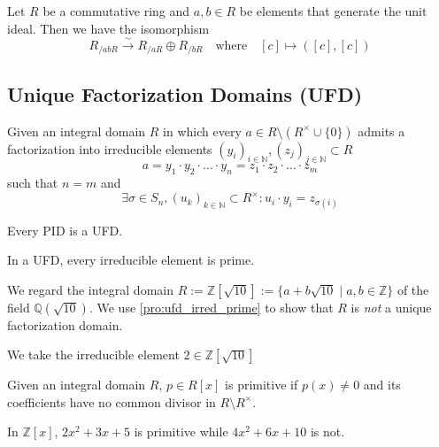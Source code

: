 \begin{lemma}
   Let \(R\) be a commutative ring and \(a, b \in R\) be elements that generate the unit ideal.
   Then we have the isomorphism
   \[R_{/abR} \xrightarrow{\sim} R_{/aR} \oplus R_{/bR} \quad\text{where}\quad [c] \mapsto ([c], [c])\]
\end{lemma}

\begin{theorem}
\end{theorem}

\subsection{Unique Factorization Domains (UFD)}
\begin{definition}\label{def:ufd}
   Given an integral domain \(R\) in which every \(a \in R \setminus (R^\times \cup \{0\})\) admits a factorization into irreducible elements \((y_i)_{i \in \mathbb{N}}, (z_j)_{j \in \mathbb{N}} \subset R\)
   \[a = y_1 \cdot y_2 \cdot \ldots \cdot y_n = z_1 \cdot z_2 \cdot \ldots \cdot z_m\]
   such that \(n = m\) and
   \[\exists \sigma \in S_n, (u_k)_{k \in \mathbb{N}} \subset R^\times: u_i \cdot y_i = z_{\sigma(i)}\]
\end{definition}

\begin{proposition}
   Every PID is a UFD.
\end{proposition}

\begin{proposition}\label{pro:ufd_irred_prime}
   In a UFD, every irreducible element is prime.
\end{proposition}
\begin{example}
   We regard the integral domain \(R := \mathbb{Z}[\sqrt{10}] := \{a + b\sqrt{10} \mid a, b \in \mathbb{Z}\}\) of the field \(\mathbb{Q}(\sqrt{10})\).
   We use \cref{pro:ufd_irred_prime} to show that \(R\) is \emph{not} a unique factorization domain.

   We take the irreducible element \(2 \in \mathbb{Z}[\sqrt{10}]\)
\end{example}

\begin{definition}
   Given an integral domain \(R\), \(p \in R[x]\) is primitive if \(p(x) \neq 0\) and its coefficients have no common divisor in \(R \setminus R^\times\).
\end{definition}
\begin{example}
   In \(\mathbb{Z}[x]\), \(2x^2 + 3x + 5\) is primitive while \(4x^2 + 6x + 10\) is not.
\end{example}

